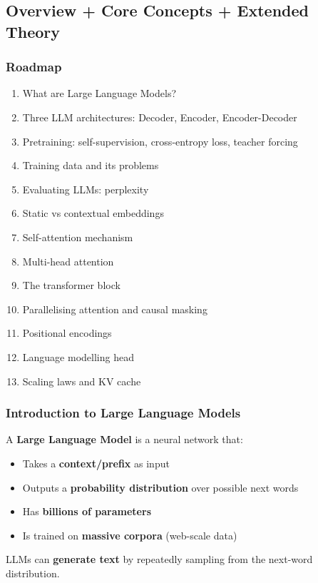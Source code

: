 \bigseparator

\subsection{Overview + Core Concepts + Extended Theory}

\subsubsection*{Roadmap}
\begin{enumerate}
  \item What are Large Language Models?
  \item Three LLM architectures: Decoder, Encoder, Encoder-Decoder
  \item Pretraining: self-supervision, cross-entropy loss, teacher forcing
  \item Training data and its problems
  \item Evaluating LLMs: perplexity
  \item Static vs contextual embeddings
  \item Self-attention mechanism
  \item Multi-head attention
  \item The transformer block
  \item Parallelising attention and causal masking
  \item Positional encodings
  \item Language modelling head
  \item Scaling laws and KV cache
\end{enumerate}

\bigseparator

\subsubsection{Introduction to Large Language Models}

\begin{defbox}
A \textbf{Large Language Model} is a neural network that:
\begin{itemize}
  \item Takes a \textbf{context/prefix} as input
  \item Outputs a \textbf{probability distribution} over possible next words
  \item Has \textbf{billions of parameters}
  \item Is trained on \textbf{massive corpora} (web-scale data)
\end{itemize}

LLMs can \textbf{generate text} by repeatedly sampling from the next-word distribution.
\end{defbox}

